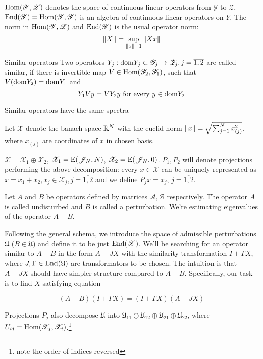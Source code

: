 \documentclass{article}
\begin{document}
$\mathrm{Hom}({\mathscr Y},{\mathscr Z})$ denotes the space of continuous linear operators
from $\mathscr Y$ to $\mathscr Z$,
$\mathrm{End}({\mathscr Y}) = \mathrm{Hom}({\mathscr Y},{\mathscr Y})$ is an algebra of continuous linear operators on $Y$.
The norm in $\mathrm{Hom}({\mathscr Y},{\mathscr Z})$ and $\mathrm{End}({\mathscr Y})$ is the usual operator norm:
$$\left\|{X}\right\| = \sup_{\left\|{x}\right\| = 1}{\left\|{X x}\right\|}$$
\begin{dfn}{Similar operators}
    Two operators $Y_j:\mathrm{dom} {Y_j}\subset\mathscr Y_j\to\mathscr Z_j, j=\overline{1,2}$ are called similar,
    if there is invertible map $V\in\mathrm{Hom}({\mathscr Y_2},{\mathscr Y_1})$,
    such that $V(\mathrm{dom} {Y_2}) = \mathrm{dom} {Y_1}$ and
    $$Y_1 V y = V Y_2 y \text{ for every } y\in\mathrm{dom} {Y_2}$$
\end{dfn}
\begin{propose}
    Similar operators have the same spectra
\end{propose}

Let $\mathscr X$ denote the banach space $\mathbb{R}^N$ with the euclid norm
$\left\|{x}\right\| = \sqrt{\sum_{j=1}^N x_{(j)}^2}$, where $x_{(j)}$ are coordinates of $x$ in chosen basis.

$\mathscr X = \mathscr X_1 \oplus \mathscr X_2$,
$\mathscr X_1 = \mathrm{E}({\mathscr{J}_{N}}, {N})$,
$\mathscr X_2 = \mathrm{E}({\mathscr{J}_{N}}, {0})$.
$P_1, P_2$ will denote projections performing the above decomposition:
every $x\in\mathscr X$ can be uniquely represented as $x = x_1 + x_2, x_j\in\mathscr X_j,j=\overline{1,2}$
and we define $P_j x = x_j$, $j=\overline{1,2}$.

Let $A$ and $B$ be operators defined by matrices $\mathcal A, \mathcal B$ respectively.
The operator $A$ is called undisturbed and $B$ is called a perturbation.
We're estimating eigenvalues of the operator $A - B$.

Following the general schema, we introduce
the space of admissible perturbations $\mathfrak U$ ($B\in\mathfrak U$)
and define it to be just $\mathrm{End}({\mathscr X})$.
We'll be searching for an operator similar to $A - B$
in the form $A - JX$ with the similarity transformation $I + \Gamma X$,
where $J, \Gamma \in \mathrm{End}({\mathfrak U})$ are transformators to be chosen.
The intuition is that $A - JX$ should have simpler structure compared to $A-B$.
Specifically, our task is to find $X$ satisfying equation

$$(A - B)(I + \Gamma X) = (I + \Gamma X)(A - JX)$$

Projections $P_j$ also decompose $\mathfrak U$ into
$\mathfrak U_{11} \oplus \mathfrak U_{12} \oplus \mathfrak U_{21} \oplus \mathfrak U_{22}$,
where $U_{ij} = \mathrm{Hom}({\mathscr X_j},{\mathscr X_i})$.\footnote{note the order of indices reversed}
\end{document}
